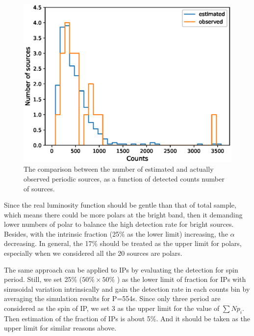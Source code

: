 \documentclass[fleqn,usenatbib]{mnras}
\begin{document}
\begin{figure}
\includegraphics[scale=0.53]{./figure/sim_LW/est_obs.eps}
\caption{The comparison between the number of estimated and actually observed periodic sources, as a function of detected counts number of sources. \label{fig:NP_sim}}
\end{figure}

Since the real luminosity function should be gentle than that of total sample, which means there could be more polars at the bright band, then it demanding lower numbers of polar to balance the high detection rate for bright sources. Besides, with the intrinsic fraction (25\% as the lower limit) increasing, the $\alpha$ decreasing.
In general, the 17\% should be treated as the upper limit for polars, especially when we considered all the 20 sources are polars. 

The same approach can be applied to IPs by evaluating the detection for spin period. Still, we set 25\% ($50\% \times 50\%$ ) as the lower limit of fraction for IPs with sinusoidal variation intrinsically and gain the detection rate in each counts bin by averaging the simulation results for P=554s. Since only three period are considered as the spin of IP, we set 3 as the upper limit for the value of $\sum Np_{i}$. Then estimation of the fraction of IPs is about 5\%. And it should be taken as the upper limit for similar reasons above.
\end{document}
